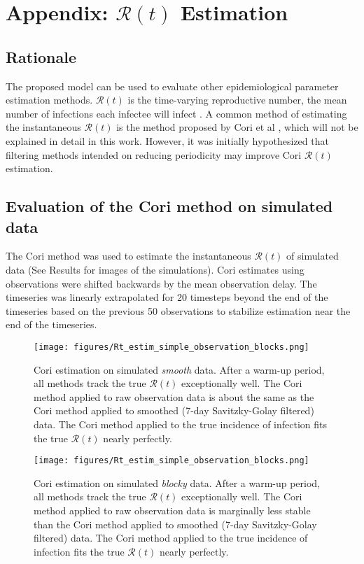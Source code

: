 \documentclass{article}
\newcommand{\nR}{\mathcal{R}}
\begin{document}
\section{Appendix: $\nR(t)$ Estimation}
\subsection{Rationale}
The proposed model can be used to evaluate other epidemiological parameter estimation methods. $\nR(t)$ is the time-varying reproductive number, the mean number of infections each infectee will infect \cite{Gostic}. A common method of estimating the instantaneous $\nR(t)$ is the method proposed by Cori et al \cite{Cori}, which will not be explained in detail in this work. However, it was initially hypothesized that filtering methods intended on reducing periodicity may improve Cori $\nR(t)$ estimation. 


\subsection{Evaluation of the Cori method on simulated data}
The Cori method was used to estimate the instantaneous $\nR(t)$ of simulated data (See Results for images of the simulations). Cori estimates using observations were shifted backwards by the mean observation delay. The timeseries was linearly extrapolated for 20 timesteps beyond the end of the timeseries based on the previous 50 observations to stabilize estimation near the end of the timeseries.

\begin{figure}[h!]
\centering
\texttt{[image: figures/Rt\_estim\_simple\_observation\_blocks.png]}
\caption{Cori estimation on simulated \emph{smooth} data. After a warm-up period, all methods track the true $\nR(t)$ exceptionally well. The Cori method applied to raw observation data is about the same as the Cori method applied to smoothed (7-day Savitzky-Golay filtered) data. The Cori method applied to the true incidence of infection fits the true $\nR(t)$ nearly perfectly.}
\end{figure}

\clearpage

\begin{figure}[h!]
\centering
\texttt{[image: figures/Rt\_estim\_simple\_observation\_blocks.png]}
\caption{Cori estimation on simulated \emph{blocky} data. After a warm-up period, all methods track the true $\nR(t)$ exceptionally well. The Cori method applied to raw observation data is marginally less stable than the Cori method applied to smoothed (7-day Savitzky-Golay filtered) data. The Cori method applied to the true incidence of infection fits the true $\nR(t)$ nearly perfectly.} 
\end{figure}
\end{document}
